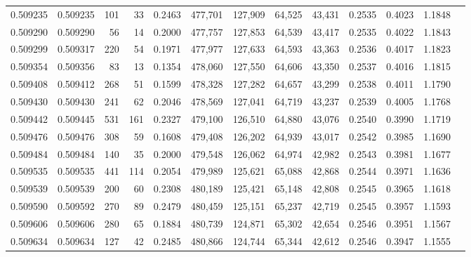 \begin{tabular}{rrrrrrrrrrrrr}
0.509235 & 0.509235 &   101 &    33 &                                     0.2463 & 477,701 & 127,909 &  64,525 &  43,431 & 0.2535 & 0.4023 & 1.1848 \\
0.509290 & 0.509290 &    56 &    14 &                                     0.2000 & 477,757 & 127,853 &  64,539 &  43,417 & 0.2535 & 0.4022 & 1.1843 \\
0.509299 & 0.509317 &   220 &    54 &                                     0.1971 & 477,977 & 127,633 &  64,593 &  43,363 & 0.2536 & 0.4017 & 1.1823 \\
0.509354 & 0.509356 &    83 &    13 &                                     0.1354 & 478,060 & 127,550 &  64,606 &  43,350 & 0.2537 & 0.4016 & 1.1815 \\
0.509408 & 0.509412 &   268 &    51 &                                     0.1599 & 478,328 & 127,282 &  64,657 &  43,299 & 0.2538 & 0.4011 & 1.1790 \\
0.509430 & 0.509430 &   241 &    62 &                                     0.2046 & 478,569 & 127,041 &  64,719 &  43,237 & 0.2539 & 0.4005 & 1.1768 \\
0.509442 & 0.509445 &   531 &   161 &                                     0.2327 & 479,100 & 126,510 &  64,880 &  43,076 & 0.2540 & 0.3990 & 1.1719 \\
0.509476 & 0.509476 &   308 &    59 &                                     0.1608 & 479,408 & 126,202 &  64,939 &  43,017 & 0.2542 & 0.3985 & 1.1690 \\
0.509484 & 0.509484 &   140 &    35 &                                     0.2000 & 479,548 & 126,062 &  64,974 &  42,982 & 0.2543 & 0.3981 & 1.1677 \\
0.509535 & 0.509535 &   441 &   114 &                                     0.2054 & 479,989 & 125,621 &  65,088 &  42,868 & 0.2544 & 0.3971 & 1.1636 \\
0.509539 & 0.509539 &   200 &    60 &                                     0.2308 & 480,189 & 125,421 &  65,148 &  42,808 & 0.2545 & 0.3965 & 1.1618 \\
0.509590 & 0.509592 &   270 &    89 &                                     0.2479 & 480,459 & 125,151 &  65,237 &  42,719 & 0.2545 & 0.3957 & 1.1593 \\
0.509606 & 0.509606 &   280 &    65 &                                     0.1884 & 480,739 & 124,871 &  65,302 &  42,654 & 0.2546 & 0.3951 & 1.1567 \\
0.509634 & 0.509634 &   127 &    42 &                                     0.2485 & 480,866 & 124,744 &  65,344 &  42,612 & 0.2546 & 0.3947 & 1.1555 \\

\end{tabular}
